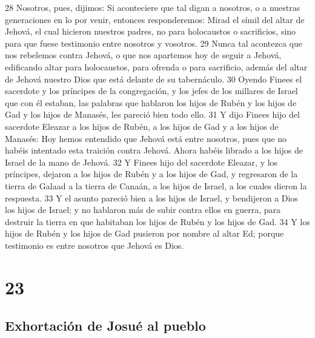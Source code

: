 28 Nosotros, pues, dijimos: Si aconteciere que tal digan a nosotros, o a nuestras generaciones en lo por venir, entonces responderemos: Mirad el símil del altar de Jehová, el cual hicieron nuestros padres, no para holocaustos o sacrificios, sino para que fuese testimonio entre nosotros y vosotros.
29 Nunca tal acontezca que nos rebelemos contra Jehová, o que nos apartemos hoy de seguir a Jehová, edificando altar para holocaustos, para ofrenda o para sacrificio, además del altar de Jehová nuestro Dios que está delante de su tabernáculo.
30 Oyendo Finees el sacerdote y los príncipes de la congregación, y los jefes de los millares de Israel que con él estaban, las palabras que hablaron los hijos de Rubén y los hijos de Gad y los hijos de Manasés, les pareció bien todo ello.
31 Y dijo Finees hijo del sacerdote Eleazar a los hijos de Rubén, a los hijos de Gad y a los hijos de Manasés: Hoy hemos entendido que Jehová está entre nosotros, pues que no habéis intentado esta traición contra Jehová. Ahora habéis librado a los hijos de Israel de la mano de Jehová.
32 Y Finees hijo del sacerdote Eleazar, y los príncipes, dejaron a los hijos de Rubén y a los hijos de Gad, y regresaron de la tierra de Galaad a la tierra de Canaán, a los hijos de Israel, a los cuales dieron la respuesta.
33 Y el asunto pareció bien a los hijos de Israel, y bendijeron a Dios los hijos de Israel; y no hablaron más de subir contra ellos en guerra, para destruir la tierra en que habitaban los hijos de Rubén y los hijos de Gad.
34 Y los hijos de Rubén y los hijos de Gad pusieron por nombre al altar Ed; porque testimonio es entre nosotros que Jehová es Dios.

\chapter{23}

\section*{Exhortación de Josué al pueblo}


